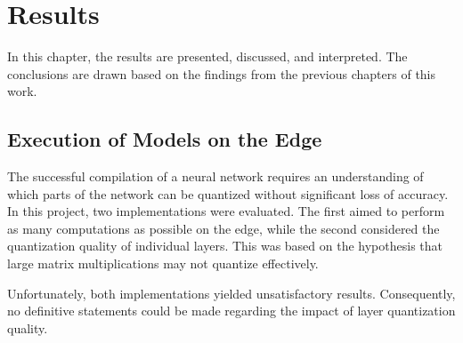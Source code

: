 




\chapter{Results}  
In this chapter, the results are presented, discussed, and interpreted.  
The conclusions are drawn based on the findings from the previous chapters of this work.  

\section{Execution of Models on the Edge}  
The successful compilation of a neural network requires an understanding of which parts of the network can be quantized without significant loss of accuracy.  
In this project, two implementations were evaluated.  
The first aimed to perform as many computations as possible on the edge, while the second considered the quantization quality of individual layers.  
This was based on the hypothesis that large matrix multiplications may not quantize effectively.  

Unfortunately, both implementations yielded unsatisfactory results.  
Consequently, no definitive statements could be made regarding the impact of layer quantization quality.  

